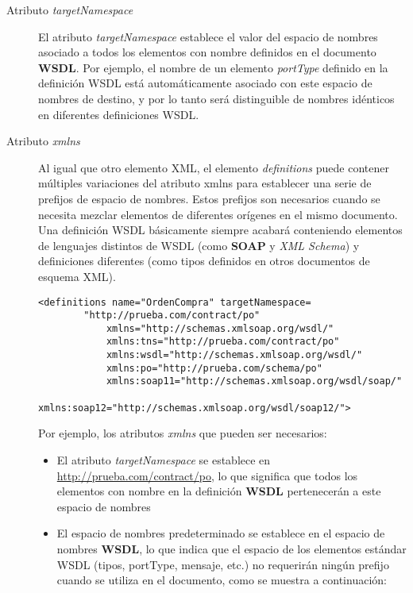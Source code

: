  \begin{description}
 	\item[Atributo \textit{targetNamespace}]  El atributo \textit{targetNamespace}   establece el valor del espacio de nombres asociado a todos los elementos con nombre definidos en el documento \textbf{WSDL}.
 	Por ejemplo, el nombre de un elemento \textit{portType} definido en la definición WSDL está automáticamente
 	asociado con este espacio de nombres de destino, y por lo tanto será distinguible de nombres idénticos en diferentes definiciones WSDL.
 	
 	\item[Atributo \textit{xmlns}] Al igual que otro elemento XML, el elemento \textit{definitions} puede contener múltiples variaciones del atributo xmlns para establecer una serie de prefijos de espacio de nombres. Estos prefijos son necesarios cuando se necesita mezclar elementos de diferentes orígenes en el mismo documento.
 	Una definición WSDL básicamente siempre acabará conteniendo elementos de lenguajes distintos de WSDL (como \textbf{SOAP} y \textit{XML Schema}) y definiciones diferentes (como tipos definidos en otros documentos de esquema XML).  
 	
 	
 	\begin{lstlisting}[label=wsdl:attr-xmlns, caption= Atributo {xmlns}. Tomado de \ER]
 		<definitions name="OrdenCompra" targetNamespace=
 		"http://prueba.com/contract/po"
 			xmlns="http://schemas.xmlsoap.org/wsdl/"
 			xmlns:tns="http://prueba.com/contract/po"
 			xmlns:wsdl="http://schemas.xmlsoap.org/wsdl/"
 			xmlns:po="http://prueba.com/schema/po"
 			xmlns:soap11="http://schemas.xmlsoap.org/wsdl/soap/"
 			xmlns:soap12="http://schemas.xmlsoap.org/wsdl/soap12/">
 	\end{lstlisting}
 	
 	 Por ejemplo, los atributos \textit{xmlns} que pueden ser necesarios:
 	\begin{itemize}
 		\item  El atributo \textit{targetNamespace} se establece en \url{http://prueba.com/contract/po}, lo que significa que todos los elementos con nombre en la definición \textbf{WSDL} pertenecerán a este  espacio de nombres
 		\item  El espacio de nombres predeterminado se establece en el espacio de nombres \textbf{WSDL}, lo que indica que el espacio de los elementos estándar WSDL (tipos, portType, mensaje, etc.) no requerirán ningún prefijo  	cuando se utiliza en el documento, como se muestra a continuación:
 		

\end{itemize}
\end{description}
